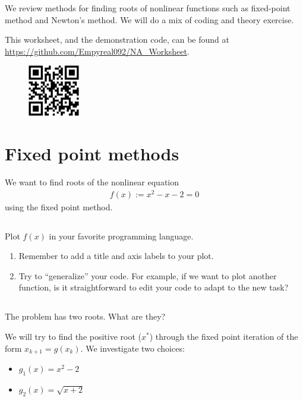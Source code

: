 \documentclass[11pt,letterpaper]{article}
\begin{document}
We review methods for finding roots of nonlinear functions such as fixed-point method and Newton's method. We will do a mix of coding and theory exercise. 

This worksheet, and the demonstration code, can be found at \url{https://github.com/Empyreal092/NA_Worksheet}.
\begin{figure}[H]
    \centering
    \includegraphics[width = 0.2\textwidth]{figs/Worksheet_git}
\end{figure}


\section{Fixed point methods}
We want to find roots of the nonlinear equation
\begin{align*}
    f(x) := x^2-x-2 = 0
\end{align*}
using the fixed point method.

\subsection{}
Plot $f(x)$ in your favorite programming language. 
\begin{enumerate}
    \item Remember to add a title and axis labels to your plot.
    \item Try to ``generalize'' your code. For example, if we want to plot another function, is it straightforward to edit your code to adapt to the new task?
\end{enumerate}


\subsection{}
The problem has two roots. What are they? 

\vspace{1cm}
We will try to find the positive root ($x^*$) through the fixed point iteration of the form $x_{k+1} = g(x_k)$. We investigate two choices:
\begin{itemize}
    \item $g_1(x) = x^2-2$
    \item $g_2(x) = \sqrt{x+2}$
\end{itemize}
\end{document}
